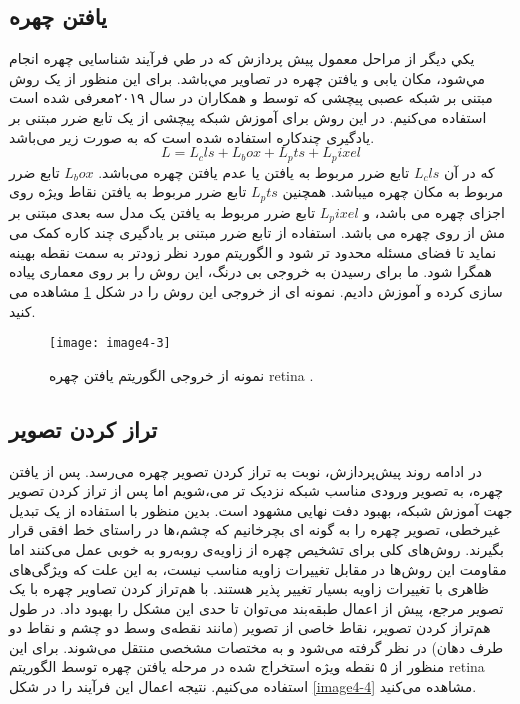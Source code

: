 \subsection{یافتن چهره}
يكي ديگر از مراحل معمول پيش پردازش كه در طي فرآيند شناسایی چهره انجام مي‌شود، مکان یابی و یافتن چهره در تصاوير مي‌باشد. برای این منظور از یک روش مبتنی بر شبکه عصبی پیچشی که توسط  و همکاران \cite{deng2019retinaface} در سال ۲۰۱۹معرفی شده است استفاده می‌کنیم. در این روش برای آموزش شبکه پیچشی از یک تابع ضرر مبتنی بر یادگیری چندکاره استفاده شده است که به صورت زیر می‌باشد.
 \begin{equation}\label{eq3-2}
L = L_cls + L_box + L_pts + L_pixel  
\end{equation}
\noindent
که در آن $L_cls$ تابع ضرر مربوط به یافتن یا عدم یافتن چهره می‌باشد. $L_box$ تابع ضرر مربوط به مکان چهره میباشد. همچنین $L_pts$ تابع ضرر مربوط به یافتن نقاط ویژه روی اجزای چهره می باشد، و $L_pixel$ تابع ضرر مربوط به یافتن یک مدل سه بعدی مبتنی بر مش از روی چهره می باشد. استفاده از تابع ضرر مبتنی بر یادگیری چند کاره کمک می نماید تا فضای مسئله محدود تر شود و الگوریتم مورد نظر زودتر به سمت نقطه بهینه همگرا شود. ما برای رسیدن به خروجی بی درنگ، این روش را بر روی معماری  پیاده سازی کرده و آموزش دادیم. نمونه ای از خروجی این روش را در شکل \ref{image4-3} مشاهده می کنید. 
\begin{figure}[h]
\centering
  \texttt{[image: image4-3]}
  \caption{نمونه از خروجی الگوریتم یافتن چهره retina \cite{deng2019retinaface}.}
  \label{image4-3}
\end{figure}

\subsection{تراز کردن تصویر}
در ادامه روند پیش‌پردازش، نوبت به تراز کردن تصویر چهره  می‌رسد. پس از یافتن چهره، به تصویر ورودی مناسب شبکه نزدیک تر می،شویم اما پس از تراز کردن تصویر جهت آموزش شبکه، بهبود دفت نهایی مشهود است. 
بدین منظور با استفاده از یک تبدیل غیرخطی، تصویر چهره را به گونه ای بچرخانیم که چشم،ها در راستای خط افقی قرار بگیرند.
روش‌های کلی برای تشخیص چهره از زاویه‌ی روبه‌رو به خوبی عمل می‌کنند اما مقاومت این روش‌ها در مقابل تغییرات زاویه مناسب نیست، به این علت که ویژگی‌های ظاهری با تغییرات زاویه بسیار تغییر پذیر هستند. با هم‌تراز  کردن تصاویر چهره  با یک تصویر مرجع، پیش از اعمال طبقه‌بند می‌توان تا حدی این مشکل را بهبود داد. در طول هم‌تراز کردن تصویر، نقاط خاصی از تصویر (مانند نقطه‌ی وسط دو چشم و نقاط دو طرف دهان) در نظر گرفته می‌شود و به مختصات مشخصی منتقل می‌شوند. برای این منظور از ۵ نقطه ویژه استخراج شده در مرحله یافتن چهره توسط الگوریتم retina استفاده می‌کنیم. نتیجه اعمال این فرآیند را در شکل \ref{image4-4} مشاهده می‌کنید.

